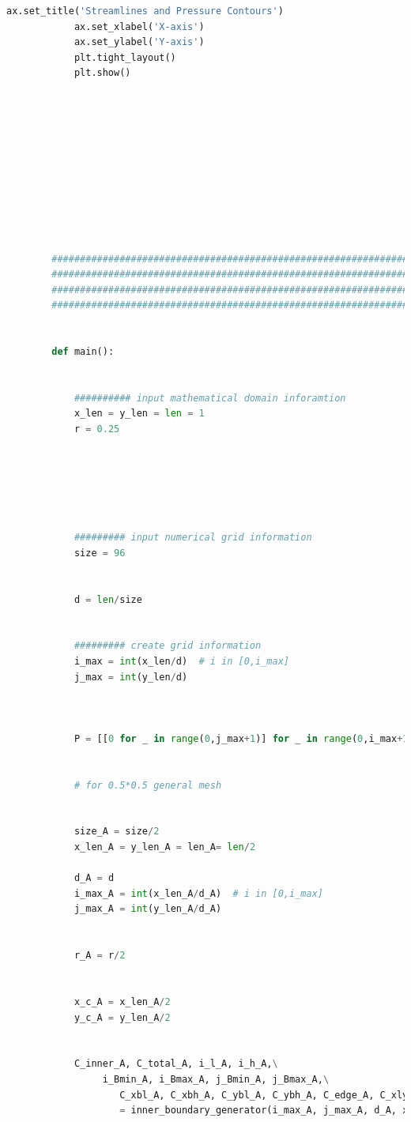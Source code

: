 \documentclass[12pt]{article}
\begin{document}
\begin{scriptsize}
\begin{lstlisting}[language=python,caption={Python code-Potential Flow}]
            ax.set_title('Streamlines and Pressure Contours')
            ax.set_xlabel('X-axis')
            ax.set_ylabel('Y-axis')
            plt.tight_layout()
            plt.show()
        
        
        
        
        
        
        
        
         
                
        
        ##########################################################################################
        ##########################################################################################
        ##########################################################################################
        ##########################################################################################
        
        
        def main():
        
        
            ########## input mathematical domain inforamtion
            x_len = y_len = len = 1
            r = 0.25
        
        
            
            
        
        
            ######### input numerical grid information
            size = 96
        
        
            d = len/size
        
        
            ######### create grid information
            i_max = int(x_len/d)  # i in [0,i_max]
            j_max = int(y_len/d)
        
        
        
            P = [[0 for _ in range(0,j_max+1)] for _ in range(0,i_max+1)]
        
        
            # for 0.5*0.5 general mesh
        
        
            size_A = size/2
            x_len_A = y_len_A = len_A= len/2
        
            d_A = d
            i_max_A = int(x_len_A/d_A)  # i in [0,i_max]
            j_max_A = int(y_len_A/d_A)
        
        
            r_A = r/2
            
            
            x_c_A = x_len_A/2
            y_c_A = y_len_A/2
        
        
            C_inner_A, C_total_A, i_l_A, i_h_A,\
                 i_Bmin_A, i_Bmax_A, j_Bmin_A, j_Bmax_A,\
                    C_xbl_A, C_xbh_A, C_ybl_A, C_ybh_A, C_edge_A, C_xlyl_A, C_xlyh_A, C_xhyl_A, C_xhyh_A \
                    = inner_boundary_generator(i_max_A, j_max_A, d_A, x_len_A, y_len_A, len_A, x_c_A, y_c_A, r_A, size_A)
            

\end{lstlisting}
\end{scriptsize}
\end{document}
